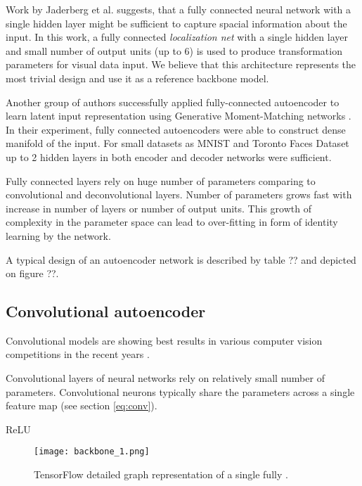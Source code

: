 Work by Jaderberg et al. \cite{Jaderberg2015} suggests, that a fully connected neural network with a single hidden layer might be sufficient to capture spacial information about the input.
In this work, a fully connected \textit{localization net} with a single hidden layer and small number of output units (up to 6) is used to produce transformation parameters for visual data input.
We believe that this architecture represents the most trivial design and use it as a reference backbone model.

Another group of authors successfully applied fully-connected autoencoder to learn latent input representation using Generative Moment-Matching networks \cite{Li2015}. In their experiment, fully connected autoencoders were able to construct dense manifold of the input. For small datasets as MNIST and Toronto Faces Dataset \cite{tfd,lecun-mnisthandwrittendigit-2010} up to 2 hidden layers in both encoder and decoder networks were sufficient.

Fully connected layers rely on huge number of parameters comparing to convolutional and deconvolutional layers.
Number of parameters grows fast with increase in number of layers or number of output units.
This growth of complexity in the parameter space can lead to over-fitting in form of identity learning by the network.

A typical design of an autoencoder network is described by table ?? and depicted on figure ??.

\subsection{Convolutional autoencoder}

Convolutional models are showing best results in various computer vision competitions in the recent years \cite{ILSVRC15, Zhou2016}.

Convolutional layers of neural networks rely on relatively small number of parameters.
Convolutional neurons typically share the parameters across a single feature map (see section \ref{eq:conv}).

ReLU \cite{Nair2010}

\begin{figure}[h!]
  \centering
    \texttt{[image: backbone\_1.png]}
  \caption{TensorFlow detailed graph representation of a single fully .}
  \label{fig:tf_graph}
\end{figure}

